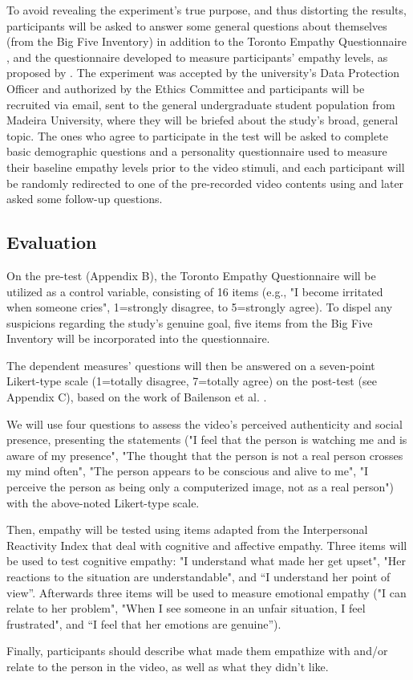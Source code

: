 To avoid revealing the experiment's true purpose, and thus distorting the results, participants will be asked to answer some general questions about themselves (from the Big Five Inventory) in addition to the Toronto Empathy Questionnaire \cite{SPR03}, and the questionnaire developed to measure participants' empathy levels, as proposed by \cite{ROT19, ZIB19}. 
The experiment was accepted by the university's Data Protection Officer and authorized by the Ethics Committee and participants will be recruited via email, sent to the general undergraduate student population from Madeira University, where they will be briefed about the study's broad, general topic.
The ones who agree to participate in the test will be asked to complete basic demographic questions and a personality questionnaire used to measure their baseline empathy levels prior to the video stimuli, and each participant will be randomly redirected to one of the pre-recorded video contents using \cite{FER19} and later asked some follow-up questions.

\subsection{Evaluation}
On the pre-test (Appendix B), the Toronto Empathy Questionnaire \cite{SPR03} will be utilized as a control variable, consisting of 16 items (e.g., "I become irritated when someone cries", 1=strongly disagree, to 5=strongly agree). To dispel any suspicions regarding the study's genuine goal, five items from the Big Five Inventory \cite{JOH91} will be incorporated into the questionnaire.

The dependent measures' questions will then be answered on a seven-point Likert-type scale (1=totally disagree, 7=totally agree) on the post-test (see Appendix C), based on the work of Bailenson et al. \cite{BAI03}.

We will use four questions to assess the video's perceived authenticity and social presence, presenting the statements ("I feel that the person is watching me and is aware of my presence", "The thought that the person is not a real person crosses my mind often", "The person appears to be conscious and alive to me", "I perceive the person as being only a computerized image, not as a real person") with the above-noted Likert-type scale.

Then, empathy will be tested using items adapted from the Interpersonal Reactivity Index \cite{DAV83} that deal with cognitive and affective empathy. Three items will be used to test cognitive empathy: "I understand what made her get upset", "Her reactions to the situation are understandable", and “I understand her point of view”. Afterwards three items will be used to measure emotional empathy ("I can relate to her problem", "When I see someone in an unfair situation, I feel frustrated", and “I feel that her emotions are genuine”).

Finally, participants should describe what made them empathize with and/or relate to the person in the video, as well as what they didn't like.
